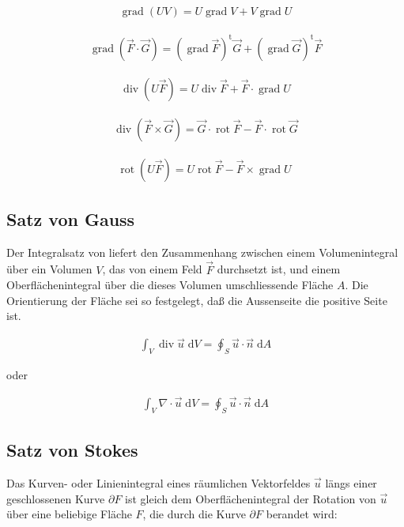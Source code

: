 \documentclass[a4paper, 10pt]{scrartcl}
\begin{document}
	\begin{align}
		\operatorname{grad}(UV)=U\operatorname{grad}V+V\operatorname{grad}U
	\end{align}
	
	\begin{align}
		\operatorname{grad}(\vec{F}\cdot \vec{G}) =
		(\operatorname{grad}\vec{F})^{\operatorname t}\vec{G} + (\operatorname{grad}\vec{G})^{\operatorname t}\vec{F}
	\end{align}
	
	\begin{align}
		\operatorname{div}(U\vec{F})=U\operatorname{div}\vec{F}+
		\vec{F}\cdot\operatorname{grad}U
	\end{align}
	
	\begin{align}
		\operatorname{div}(\vec{F}\times \vec{G})= \vec{G} \cdot
		\operatorname{rot}\vec{F} -\vec{F}\cdot\operatorname{rot}\vec{G}
	\end{align}
	
	\begin{align}
		\operatorname{rot}(U\vec{F})= U\operatorname{rot}\vec{F}
		-\vec{F}\times\operatorname{grad}U\
	\end{align}
	\subsection{Satz von Gauss}
	Der Integralsatz von  liefert den Zusammenhang zwischen einem Volumenintegral
	über ein Volumen $V$, das von einem Feld $\vec F$ durchsetzt ist, und einem
	Oberflächenintegral über die dieses Volumen umschliessende Fläche $A$. Die
	Orientierung der Fläche sei so festgelegt, daß die Aussenseite die positive
	Seite ist.
	
	\begin{align}
		\int_V \operatorname{div} \vec u \; \mathrm dV = \oint_{S} \vec u \cdot
		\vec n\; \mathrm dA
	\end{align}
	
	oder
	
	\begin{align}
		\int_V \nabla \cdot \vec u \; \mathrm dV = \oint_{S} \vec u \cdot
		\vec n\; \mathrm dA
	\end{align}
	
	\subsection{Satz von Stokes}
	Das Kurven- oder Linienintegral eines räumlichen Vektorfeldes $\vec u$ längs
	einer geschlossenen Kurve $\partial F$ ist gleich dem Oberflächenintegral der
	Rotation von $\vec u$ über eine beliebige Fläche $F$, die durch die Kurve
	$\partial F$ berandet wird:
	
\end{document}
